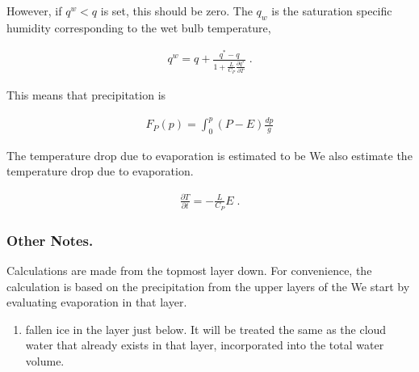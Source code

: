 However, if \(q^w < q\) is set, this should be zero. The \(q_w\) is the
saturation specific humidity corresponding to the wet bulb temperature,

\begin{eqnarray}
  q^w = q + \frac{q^* - q}{1+ \frac{L}{C_P}\frac{\partial q^*}{\partial T}} \; .
\end{eqnarray}

This means that precipitation is

\begin{eqnarray}
  F_P(p) = \int_0^p (P - E) \frac{dp}{g}
\end{eqnarray}

The temperature drop due to evaporation is estimated to be We also
estimate the temperature drop due to evaporation.

\begin{eqnarray}
  \frac{\partial T}{\partial t} = - \frac{L}{C_P} E \; .
\end{eqnarray}

\hypertarget{other-notes.}{%
\subsubsection{Other Notes.}\label{other-notes.}}

Calculations are made from the topmost layer down. For convenience, the
calculation is based on the precipitation from the upper layers of the
We start by evaluating evaporation in that layer.

\begin{enumerate}
\def\labelenumi{\arabic{enumi}.}
\setcounter{enumi}{1}
\tightlist
\item
  fallen ice in the layer just below. It will be treated the same as the
  cloud water that already exists in that layer, incorporated into the
  total water volume.
\end{enumerate}
